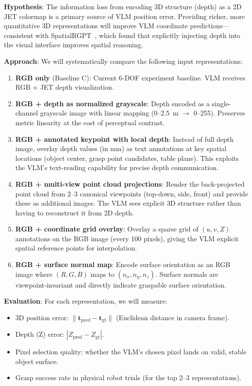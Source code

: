 \documentclass[11pt,a4paper]{article}
\begin{document}
\textbf{Hypothesis}: The information loss from encoding 3D structure (depth) as a 2D JET colormap is a primary source of VLM position error. Providing richer, more quantitative 3D representations will improve VLM coordinate predictions---consistent with SpatialRGPT~\cite{cheng2024spatialrgpt}, which found that explicitly injecting depth into the visual interface improves spatial reasoning.

\textbf{Approach}: We will systematically compare the following input representations:

\begin{enumerate}[label=\textbf{R\arabic*:}, leftmargin=*]
    \item \textbf{RGB only} (Baseline C): Current 6-DOF experiment baseline. VLM receives RGB + JET depth visualization.
    \item \textbf{RGB + depth as normalized grayscale}: Depth encoded as a single-channel grayscale image with linear mapping (0--2.5~m $\rightarrow$ 0--255). Preserves metric linearity at the cost of perceptual contrast.
    \item \textbf{RGB + annotated keypoint with local depth}: Instead of full depth image, overlay depth values (in mm) as text annotations at key spatial locations (object center, grasp point candidates, table plane). This exploits the VLM's text-reading capability for precise depth communication.
    \item \textbf{RGB + multi-view point cloud projections}: Render the back-projected point cloud from 2--3 canonical viewpoints (top-down, side, front) and provide these as additional images. The VLM sees explicit 3D structure rather than having to reconstruct it from 2D depth.
    \item \textbf{RGB + coordinate grid overlay}: Overlay a sparse grid of $(u, v, Z)$ annotations on the RGB image (every 100 pixels), giving the VLM explicit spatial reference points for interpolation.
    \item \textbf{RGB + surface normal map}: Encode surface orientation as an RGB image where $(R,G,B)$ maps to $(n_x, n_y, n_z)$. Surface normals are viewpoint-invariant and directly indicate graspable surface orientation.
\end{enumerate}

\textbf{Evaluation}: For each representation, we will measure:
\begin{itemize}[nosep]
    \item 3D position error: $\|\mathbf{t}_{\text{pred}} - \mathbf{t}_{\text{gt}}\|$ (Euclidean distance in camera frame).
    \item Depth (Z) error: $|Z_{\text{pred}} - Z_{\text{gt}}|$.
    \item Pixel selection quality: whether the VLM's chosen pixel lands on valid, stable object surface.
    \item Grasp success rate in physical robot trials (for the top 2--3 representations).
\end{itemize}
\end{document}
